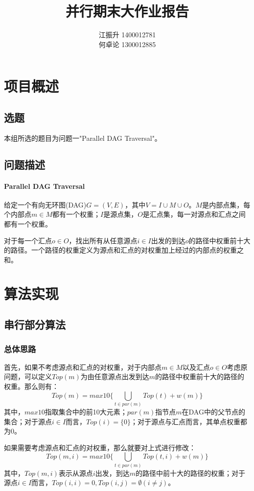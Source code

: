 \documentclass{article}
\title{并行期末大作业报告}
\author{江振升 1400012781\\
		何卓论 1300012885}
\begin{document}
	\maketitle
	\newpage
	
	\section{项目概述}
	\subsection{选题}
	本组所选的题目为问题一"Parallel DAG Traversal"。
	
	\subsection{问题描述}
	\paragraph{Parallel DAG Traversal}
	给定一个有向无环图(DAG)$G=(V, E)$，其中$V=I\cup M\cup O$。$M$是内部点集，每个内部点$m\in M$都有一个权重；$I$是源点集，$O$是汇点集，每一对源点和汇点之间都有一个权重。
	
	对于每一个汇点$o\in O$，找出所有从任意源点$i\in I$出发的到达$o$的路径中权重前十大的路径。一个路径的权重定义为源点和汇点的对权重加上经过的内部点的权重之和。
	
	\section{算法实现}
	\subsection{串行部分算法}
	\subsubsection{总体思路}
	首先，如果不考虑源点和汇点的对权重，对于内部点$m\in M$以及汇点$o\in O$考虑原问题，可以定义$Top(m)$为由任意源点出发到达$m$的路径中权重前十大的路径的权重。那么则有：
	$$Top(m)=max10\{\bigcup\limits_{t\in par(m)}Top(t)+w(m)\}$$
	其中，$max10$指取集合中的前10大元素；$par(m)$指节点$m$在DAG中的父节点的集合；对于源点$i\in I$而言，$Top(i)=\{0\}$；对于源点与汇点而言，其单点权重都为0。
	
	如果需要考虑源点和汇点的对权重，那么就要对上式进行修改：
	$$Top(m, i)=max10\{\bigcup\limits_{t\in par(m)}Top(t, i)+w(m)\}$$
	其中，$Top(m, i)$表示从源点$i$出发，到达$m$的路径中前十大的路径的权重；对于源点$i\in I$而言，$Top(i, i)={0}, Top(i, j)=\emptyset (i\neq j)$。
	
\end{document}
